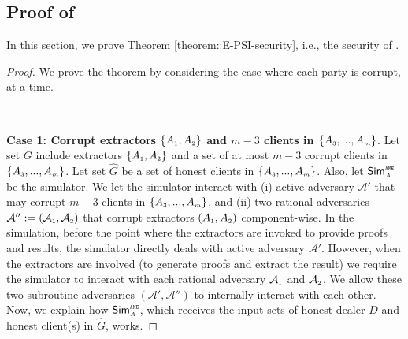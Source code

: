 

\subsection{Proof of \epsi}\label{sec::E-PSI-proof}



In this section, we prove Theorem \ref{theorem::E-PSI-security}, i.e., the security of \epsi. 


\begin{proof}
%
We prove the theorem by considering the case where each party is corrupt, at a time.

\



\noindent\textbf{Case 1: Corrupt extractors $\{A_{\scriptscriptstyle 1}, A_{\scriptscriptstyle 2}\}$ and $m-3$ clients in $\{  {  A}_{ \scriptscriptstyle {   3}}, ...,   {  A}_{ \scriptscriptstyle {   m}}\}$}.  Let set $G$ include extractors $\{A_{\scriptscriptstyle 1}, A_{\scriptscriptstyle 2}\}$ and a set of at most $m-3$ corrupt clients in $\{  {  A}_{ \scriptscriptstyle {   3}}, ...,   {  A}_{ \scriptscriptstyle {   m}}\}$. Let set $\hat G$ be a set of honest clients in  $\{  {  A}_{ \scriptscriptstyle {   3}}, ...,   {  A}_{ \scriptscriptstyle {   m}}\}$. Also, let $\mathsf{Sim}^{\scriptscriptstyle\mathtt{ANE}}_{\scriptscriptstyle A}$ be the simulator. We let the simulator  interact with (i) active adversary  $\mathcal{A}'$ that may corrupt $m-3$ clients in $\{  {  A}_{ \scriptscriptstyle {   3}}, ...,   {  A}_{ \scriptscriptstyle {   m}}\}$, and (ii) two rational adversaries  $\mathcal{A}'':=(\mathcal{A}_{\scriptscriptstyle 1}, \mathcal{A}_{\scriptscriptstyle 2})$ that corrupt extractors $(A_{\scriptscriptstyle 1},A_{\scriptscriptstyle 2})$ component-wise.  
%
%
In the simulation, before the point where the extractors are invoked to provide proofs and results, the simulator directly deals with active adversary  $\mathcal{A}'$. However, when the extractors are involved (to generate proofs and extract the result) we require the simulator to interact with each rational adversary $\mathcal{A}_{\scriptscriptstyle 1}$ and $\mathcal{A}_{\scriptscriptstyle 2}$.  We allow these two subroutine adversaries $(\mathcal{A}', \mathcal{A}'')$  to internally interact with each other.  Now, we explain how $\mathsf{Sim}^{\scriptscriptstyle \mathtt{ANE}}_{\scriptscriptstyle A}$, which receives the input sets of honest dealer $D$ and honest client(s) in $\hat G$,  works. 




\end{proof}

